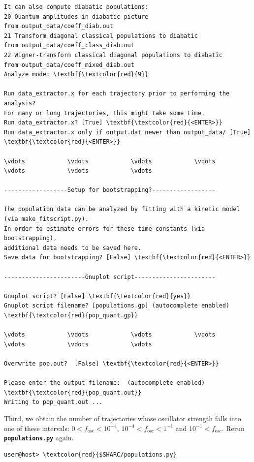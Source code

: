 \documentclass[a4paper,11pt,DIV=15,openany]{scrbook}
\newcommand{\ttt}[1]{\textbf{\texttt{#1}}}
\begin{document}
\begin{oframed}
\begin{Verbatim}[commandchars=\\\{\}]
It can also compute diabatic populations:
20 Quantum amplitudes in diabatic picture                              from output_data/coeff_diab.out
21 Transform diagonal classical populations to diabatic                from output_data/coeff_class_diab.out
22 Wigner-transform classical diagonal populations to diabatic         from output_data/coeff_mixed_diab.out
Analyze mode: \textbf{\textcolor{red}{9}}

Run data_extractor.x for each trajectory prior to performing the analysis?
For many or long trajectories, this might take some time.
Run data_extractor.x? [True] \textbf{\textcolor{red}{<ENTER>}}
Run data_extractor.x only if output.dat newer than output_data/ [True] \textbf{\textcolor{red}{<ENTER>}}

\vdots            \vdots            \vdots            \vdots            \vdots            \vdots            \vdots            

------------------Setup for bootstrapping?------------------

The population data can be analyzed by fitting with a kinetic model (via make_fitscript.py). 
In order to estimate errors for these time constants (via bootstrapping), 
additional data needs to be saved here.
Save data for bootstrapping? [False] \textbf{\textcolor{red}{<ENTER>}}

-----------------------Gnuplot script-----------------------

Gnuplot script? [False] \textbf{\textcolor{red}{yes}}
Gnuplot script filename? [populations.gp] (autocomplete enabled) \textbf{\textcolor{red}{pop_quant.gp}}

\vdots            \vdots            \vdots            \vdots            \vdots            \vdots            \vdots            

Overwrite pop.out?  [False] \textbf{\textcolor{red}{<ENTER>}}

Please enter the output filename:  (autocomplete enabled) \textbf{\textcolor{red}{pop_quant.out}}
Writing to pop_quant.out ...
\end{Verbatim}
\end{oframed}

\normalsize
Third, we obtain the number of trajectories whose oscillator strength falls into one of these intervals: $0<f_\text{osc}<10^{-4}$, $10^{-4}<f_\text{osc}<1^{-1}$ and $10^{-1}<f_\text{osc}$. Rerun \ttt{populations.py} again.
\begin{Verbatim}[commandchars=\\\{\}]
user@host> \textcolor{red}{$SHARC/populations.py}
\end{Verbatim}
\end{document}
